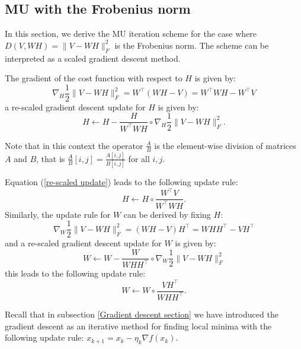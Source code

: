 \subsection{MU with the Frobenius norm}
In this section, we derive the MU iteration scheme for the case where
$D(V, WH) = \|V - WH\|_F^2$ is the Frobenius norm.
The scheme can be interpreted as a scaled gradient descent method.\\
\par
The gradient of the cost function with respect to \( H \) is given by:
\begin{equation}
    \nabla_H \frac{1}{2} \|V - WH\|_F^2 = W^\top (WH - V) = W^\top WH - W^\top V
\end{equation}
a re-scaled gradient descent update for \( H \) is given by:
\begin{equation}\label{re-scaled update}
    H \leftarrow H - \frac{H}{W^\top WH} \circ \nabla_H \frac{1}{2} \|V - WH\|_F^2.
\end{equation}
\begin{remark}
    Note that in this context the operator $\frac{A}{B}$ is the element-wise division of matrices $A$ and $B$, that is $\frac{A}{B}[i,j] = \frac{A[i,j]}{B[i,j]}$ for all $i,j$. %
\end{remark}
Equation (\ref{re-scaled update}) leads to the following update rule:
\begin{equation}
    H \leftarrow H \circ \frac{W^\top V}{W^\top WH}.
\end{equation}
Similarly, the update rule for \( W \) can be derived by fixing \( H \):
\begin{equation}
    \nabla_W \frac{1}{2} \|V - WH\|_F^2 = (WH - V) H^\top = W H H^\top - V H^\top
\end{equation}
and a re-scaled gradient descent update for \( W \) is given by:
\begin{equation}
    W \leftarrow W - \frac{W}{W H H^\top} \circ \nabla_W \frac{1}{2} \|V - WH\|_F^2
\end{equation}
this leads to the following update rule:
\begin{equation}
    W \leftarrow W \circ \frac{V H^\top}{W H H^\top}.
\end{equation}
\par
Recall that in subsection \ref{Gradient descent section} we have introduced the gradient descent as an iterative method for finding local minima with the following update rule: $x_{k+1} = x_k - \eta_k\nabla f(x_k)$.

